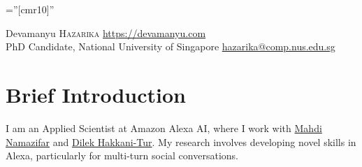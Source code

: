 \documentclass[a4paper,10pt]{article}
\begin{document}

\pagestyle{empty} %

\font\fb=''[cmr10]'' %

\par{
	{\Huge Devamanyu \textsc{Hazarika}
	}\hfill \href{https://devamanyu.com}{https://devamanyu.com} \\ 
	PhD Candidate, National University of Singapore \hfill \href{mailto:hazarika@comp.nus.edu.sg}{hazarika@comp.nus.edu.sg}
	\bigskip
	\bigskip
\par}



\section{Brief Introduction}
\vspace{0.1cm}

I am an Applied Scientist at Amazon Alexa AI, where I work with \href{https://www.linkedin.com/in/namazifar/}{Mahdi Namazifar} and \href{https://scholar.google.com/citations?user=GMcL_9kAAAAJ&hl=en}{Dilek Hakkani-Tur}. My research involves developing novel skills in Alexa, particularly for multi-turn social conversations.
\end{document}
